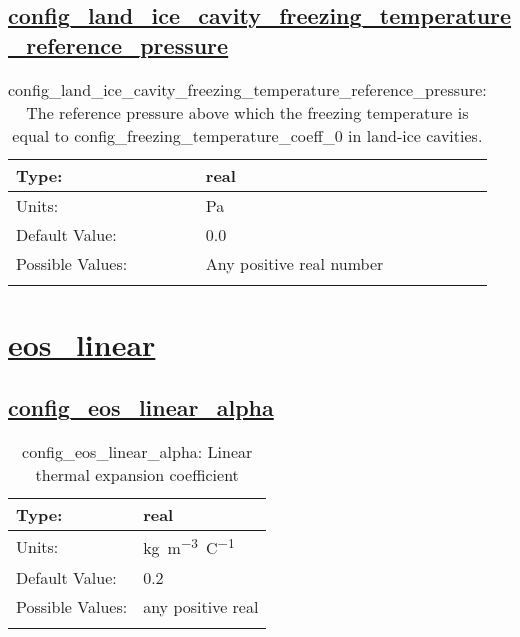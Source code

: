 \subsection[config\_land\_ice\_cavity\_freezing\_temperature\_reference\_pressure]{\hyperref[sec:nm_tab_eos]{config\_land\_ice\_cavity\_freezing\_temperature\_reference\_pressure}}
\label{subsec:nm_sec_config_land_ice_cavity_freezing_temperature_reference_pressure}
\begin{center}
\begin{longtable}{| p{2.0in} || p{4.0in} |}
    \hline
    Type: & real \\
    \hline
    Units: & \si{Pa} \\
    \hline
    Default Value: & 0.0 \\
    \hline
    Possible Values: & Any positive real number \\
    \hline
    \caption{config\_land\_ice\_cavity\_freezing\_temperature\_reference\_pressure: The reference pressure above which the freezing temperature is equal to config\_freezing\_temperature\_coeff\_0 in land-ice cavities.}
\end{longtable}
\end{center}
\section[eos\_linear]{\hyperref[sec:nm_tab_eos_linear]{eos\_linear}}
\label{sec:nm_sec_eos_linear}
\subsection[config\_eos\_linear\_alpha]{\hyperref[sec:nm_tab_eos_linear]{config\_eos\_linear\_alpha}}
\label{subsec:nm_sec_config_eos_linear_alpha}
\begin{center}
\begin{longtable}{| p{2.0in} || p{4.0in} |}
    \hline
    Type: & real \\
    \hline
    Units: & \si{kg.m^{-3}.C^{-1}} \\
    \hline
    Default Value: & 0.2 \\
    \hline
    Possible Values: & any positive real \\
    \hline
    \caption{config\_eos\_linear\_alpha: Linear thermal expansion coefficient}
\end{longtable}
\end{center}
